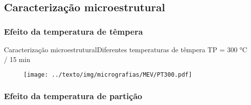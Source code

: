 \subsection{Caracterização microestrutural}

\subsubsection{Efeito da temperatura de têmpera}

\begin{frame}[t]{Caracterização microestrutural}{Diferentes temperaturas de têmpera}
	TP = 300 °C / 15 min

	\begin{figure}
		\centering
		\texttt{[image: ../texto/img/micrografias/MEV/PT300.pdf]}
	\end{figure}
\end{frame}

\subsubsection{Efeito da temperatura de partição}
%

%

